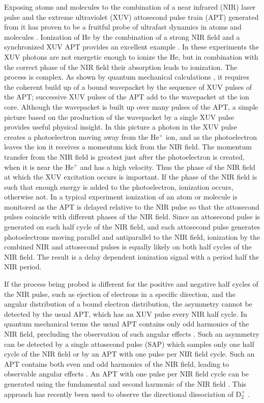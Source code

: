 \documentclass[aps,pra,reprint,groupedaddress]{revtex4-1}
\begin{document}
Exposing atoms and molecules to the combination of a near infrared (NIR) laser pulse and the extreme ultraviolet (XUV) attosecond pulse train (APT) generated from it has proven to be a fruitful probe of ultrafast dynamics in atoms and molecules \cite{Krausz}. Ionization of He by the combination of a strong NIR field and a synchronized XUV APT provides an excellent example \cite{Johnsson, Ranitovic, Tong}.  In these experiments the XUV photons are not energetic enough to ionize the He, but in combination with the correct phase of the NIR field their absorption leads to ionization. The process is complex. As shown by quantum mechanical calculations \cite{Johnsson, Ranitovic, Tong, Zhong}, it requires the coherent build up of a bound wavepacket by the sequence of XUV pulses of the APT; successive XUV pulses of the APT add to the wavepacket at the ion core. Although the wavepacket is built up over many pulses of the APT, a simple picture based on the production of the wavepacket by a single XUV pulse provides useful physical insight. In this picture a photon in the XUV pulse creates a photoelectron moving away from the He$^+$ ion, and as the photoelectron leaves the ion it receives a momentum kick from the NIR field. The momentum transfer from the NIR field is greatest just after the photoelectron is created, when it is near the He$^+$ and has a high velocity. Thus the phase of the NIR field at which the XUV excitation occurs is important. If the phase of the NIR field is such that enough energy is added to the photoelectron, ionization occurs, otherwise not. In a typical experiment ionization of an atom or molecule is monitored as the APT is delayed relative to the NIR pulse so that the attosecond pulses coincide with different phases of the NIR field. Since an attosecond  pulse is generated on each half cycle of the NIR field, and each attosecond pulse generates photoelectrons moving parallel and antiparallel to the NIR field, ionization by the combined NIR and attosecond pulses is equally likely on both half cycles of the NIR field. The result is a delay dependent ionization signal with a period half the NIR period.

If the process being probed is different for the positive and negative half cycles of the NIR pulse, such as ejection of electrons in a specific direction, and the angular distribution of a bound electron distribution, the asymmetry cannot be detected by the usual APT, which has an XUV pulse every NIR half cycle. In quantum mechanical terms the usual APT contains only odd harmonics of the NIR field, precluding the observation of such angular effects \cite{Zhong}. Such an asymmetry can be detected by a single attosecond pulse (SAP) which samples only one half cycle of the NIR field or by an APT with one pulse per NIR field cycle. Such an APT contains both even and odd harmonics of the NIR field, leading to observable angular effects \cite{Zhong}. An APT with one pulse per NIR field cycle can be generated using the fundamental and second harmonic of the NIR field \cite{Mauritsson}. This approach has recently been used to observe the directional dissociation of D$_2^+$ \cite{Singh}.
\end{document}
